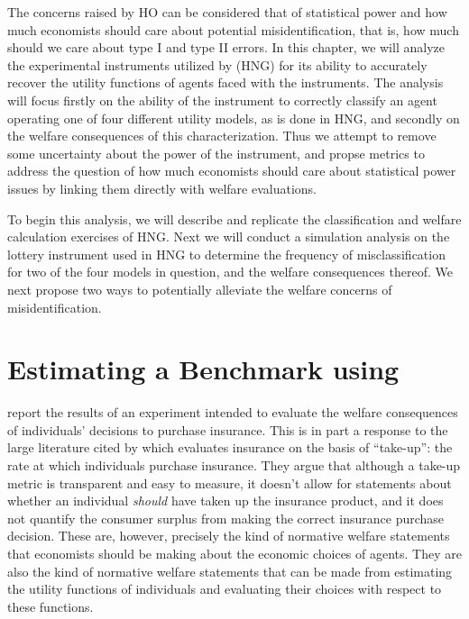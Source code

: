\documentclass[../main.tex]{subfiles}
\begin{document}
The concerns raised by HO can be considered that of statistical power and how much economists should care about potential misidentification, that is, how much should we care about type I and type II errors.
In this chapter, we will analyze the experimental instruments utilized by \textcite{Harrison2016} (HNG) for its ability to accurately recover the utility functions of agents faced with the instruments.
The analysis will focus firstly on the ability of the instrument to correctly classify an agent operating one of four different utility models, as is done in HNG, and secondly on the welfare consequences of this characterization.
Thus we attempt to remove some uncertainty about the power of the instrument, and propse metrics to address the question of how much economists should care about statistical power issues by linking them directly with welfare evaluations.

To begin this analysis, we will describe and replicate the classification and welfare calculation exercises of HNG.
Next we will conduct a simulation analysis on the lottery instrument used in HNG to determine the frequency of misclassification for two of the four models in question, and the welfare consequences thereof.
We next propose two ways to potentially alleviate the welfare concerns of misidentification.

\section{Estimating a Benchmark using \texorpdfstring{\textcite{Harrison2016}}{Harrison and Ng (2015)}}
\label{sec4:Bench}

\textcite{Harrison2016} report the results of an experiment intended to evaluate the welfare consequences of individuals' decisions to purchase insurance.
This is in part a response to the large literature cited by \textcite[92]{Harrison2016} which evaluates insurance on the basis of \enquote{take-up}: the rate at which individuals purchase insurance.
They argue that although a take-up metric is transparent and easy to measure, it doesn't allow for statements about whether an individual \textit{should} have taken up the insurance product, and it does not quantify the consumer surplus from making the correct insurance purchase decision.
These are, however, precisely the kind of normative welfare statements that economists should be making about the economic choices of agents.
They are also the kind of normative welfare statements that can be made from estimating the utility functions of individuals and evaluating their choices with respect to these functions.
\end{document}
